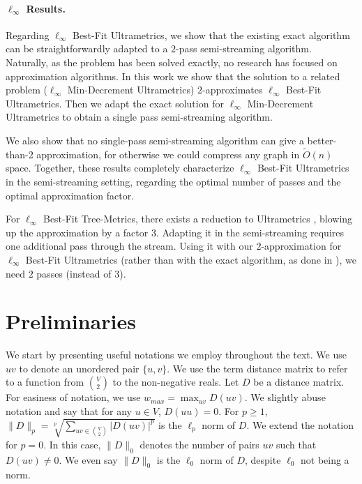 \documentclass{article}
\newcommand{\set}[1]{\{#1\}}
\begin{document}
\paragraph*{$\ell_\infty$ Results.}
Regarding $\ell_\infty$ Best-Fit Ultrametrics, we show that the existing exact algorithm \cite{farach1993robust} can be straightforwardly adapted to a $2$-pass semi-streaming algorithm.
Naturally, as the problem has been solved exactly, no research has focused on approximation algorithms.
In this work we show that the solution to a related problem ($\ell_\infty$ Min-Decrement Ultrametrics) $2$-approximates $\ell_\infty$ Best-Fit Ultrametrics.
Then we adapt the exact solution for $\ell_\infty$ Min-Decrement Ultrametrics \cite{farach1993robust} to obtain a single pass semi-streaming algorithm.

We also show that no single-pass semi-streaming algorithm can give a better-than-2 approximation, for otherwise we could compress any graph in $\widetilde{O}(n)$ space.
Together, these results completely characterize $\ell_\infty$ Best-Fit Ultrametrics in the semi-streaming setting, regarding the optimal number of passes and the optimal approximation factor.

For $\ell_\infty$ Best-Fit Tree-Metrics, there exists a reduction to Ultrametrics \cite{agarwala}, blowing up the approximation by a factor $3$.
Adapting it in the semi-streaming requires one additional pass through the stream.
Using it with our $2$-approximation for $\ell_\infty$ Best-Fit Ultrametrics (rather than with the exact algorithm, as done in \cite{agarwala}),
we need $2$ passes (instead of $3$).


\newcommand{\clusters}{\mathcal{C}}
\newcommand{\inputmatrix}{D}

\section{Preliminaries}
We start by presenting useful notations we employ throughout the text.
We use $uv$ to denote an unordered pair $\set{u,v}$.
We use the term distance matrix to refer to a function from $\binom{V}{2}$ to the non-negative reals.
Let $D$ be a distance matrix.
For easiness of notation, we use $w_{max} = \max_{uv}{D(uv)}$.
We slightly abuse notation and say that for any $u\in V$, $D(uu)=0$.
For $p \ge 1$, $\|D\|_p = \sqrt[p]{\sum_{uv \in \binom{V}{2}}|D(uv)|^p}$ is the $\ell_p$ norm of $D$.
We extend the notation for $p=0$.
In this case, $\|D\|_0$ denotes the number of pairs $uv$ such that $D(uv)\ne 0$.
We even say $\|D\|_0$ is the $\ell_0$ norm of $D$, despite $\ell_0$ not being a norm.
\end{document}
